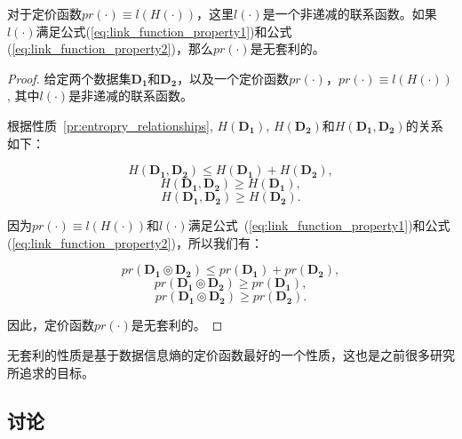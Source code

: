 \begin{lem}
对于定价函数$pr(\cdot) \equiv l(H(\cdot))$，这里$l(\cdot)$是一个非递减的联系函数。如果$l(\cdot)$满足公式(\ref{eq:link_function_property1})和公式(\ref{eq:link_function_property2})，那么$pr(\cdot)$是无套利的。
\label{lemma:arbitrage-free}

\begin{proof}

给定两个数据集$\bm{D_1}$和$\bm{D_2}$，以及一个定价函数$pr(\cdot)$，$pr(\cdot) \equiv l(H(\cdot))$, 其中$l(\cdot)$是非递减的联系函数。

根据性质~\ref{pr:entropry_relationships}, $H(\bm{D_1})$, $H(\bm{D_2})$和$H(\bm{D_1},\bm{D_2})$的关系如下：

\begin{equation}
  H(\bm{D_1},\bm{D_2})\le H(\bm{D_1})+H(\bm{D_2}),
\end{equation}
\begin{equation}
  H(\bm{D_1},\bm{D_2})\ge H(\bm{D_1}),
\end{equation}
\begin{equation}
  H(\bm{D_1},\bm{D_2})\ge H(\bm{D_2}).
\end{equation}


因为$pr(\cdot) \equiv l(H(\cdot))$和$l(\cdot)$满足公式~(\ref{eq:link_function_property1})和公式(\ref{eq:link_function_property2})，所以我们有：

\begin{equation}
  pr(\bm{D_1}\circledcirc \bm{D_2})\le pr(\bm{D_1})+pr(\bm{D_2}),
\end{equation}
\begin{equation}
  pr(\bm{D_1}\circledcirc \bm{D_2})\ge pr(\bm{D_1}),
\end{equation}
\begin{equation}
  pr(\bm{D_1}\circledcirc \bm{D_2})\ge pr(\bm{D_2}).
\end{equation}

因此，定价函数$pr(\cdot)$是无套利的。

\end{proof}

\end{lem}

无套利的性质是基于数据信息熵的定价函数最好的一个性质，这也是之前很多研究\cite{koutris2012querymarket,koutris2015query,lin2014arbitrage}所追求的目标。

\subsection{讨论}

